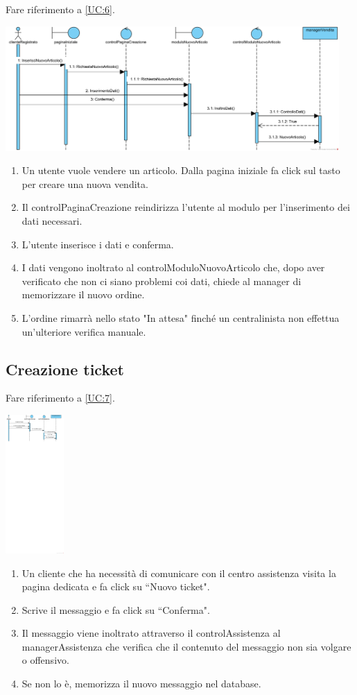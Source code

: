 \documentclass[12pt,a4paper]{article}
\begin{document}
Fare riferimento a \ref{UC:6}.

\includegraphics[height=180px]{SequenceDiagram/Vendita}

\begin{enumerate}
\item Un utente vuole vendere un articolo. Dalla pagina iniziale fa click sul tasto per creare una nuova vendita.
\item Il controlPaginaCreazione reindirizza l'utente al modulo per l'inserimento dei dati necessari.
\item L'utente inserisce i dati e conferma.
\item I dati vengono inoltrato al controlModuloNuovoArticolo che, dopo aver verificato che non ci siano problemi coi dati, chiede al manager di memorizzare il nuovo ordine.
\item L'ordine rimarrà nello stato "In attesa" finché un centralinista non effettua un'ulteriore verifica manuale.
\end{enumerate}

\subsection{Creazione ticket}

Fare riferimento a \ref{UC:7}.

\includegraphics[height=200px]{SequenceDiagram/CreazioneTicket}

\begin{enumerate}
\item Un cliente che ha necessità di comunicare con il centro assistenza visita la pagina dedicata e fa click su ``Nuovo ticket".
\item Scrive il messaggio e fa click su ``Conferma".
\item Il messaggio viene inoltrato attraverso il controlAssistenza al managerAssistenza che verifica che il contenuto del messaggio non sia volgare o offensivo.
\item Se non lo è, memorizza il nuovo messaggio nel database.
\end{enumerate}
\end{document}
